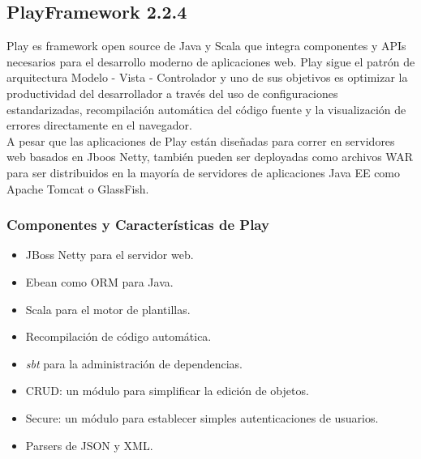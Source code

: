 \subsection{PlayFramework 2.2.4}
Play es framework open source de Java y Scala que integra componentes y APIs necesarios para el desarrollo moderno de aplicaciones web. Play sigue el patrón de arquitectura Modelo - Vista - Controlador y uno de sus objetivos es optimizar la productividad del desarrollador a través del uso de configuraciones estandarizadas, recompilación automática del código fuente y la visualización de errores directamente en el navegador.\\

A pesar que las aplicaciones de Play están diseñadas para correr en servidores web basados en Jboos Netty, también pueden ser deployadas como archivos WAR para ser distribuidos en la mayoría de servidores de aplicaciones Java EE como Apache Tomcat o GlassFish.

\subsubsection{Componentes y Características de Play}
\begin{itemize}
  \item JBoss Netty para el servidor web.
  \item Ebean como ORM para Java.
  \item Scala para el motor de plantillas.
  \item Recompilación de código automática.
  \item \emph{sbt} para la administración de dependencias.
  \item CRUD: un módulo para simplificar la edición de objetos.
  \item Secure: un módulo para establecer simples autenticaciones de usuarios.
  \item Parsers de JSON y XML.
\end{itemize}
\clearpage
